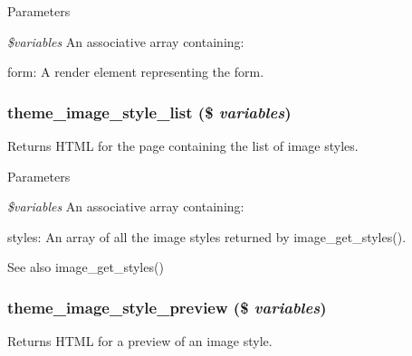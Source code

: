 \begin{DoxyParams}{Parameters}
\item[{\em \$variables}]An associative array containing:
\begin{DoxyItemize}
\item form: A render element representing the form. 
\end{DoxyItemize}\end{DoxyParams}
\hypertarget{group__themeable_gaa215d56002640f64d6fc84311b18c116}{
\subsubsection[{theme\_\-image\_\-style\_\-list}]{\setlength{\rightskip}{0pt plus 5cm}theme\_\-image\_\-style\_\-list (\$ {\em variables})}}
\label{group__themeable_gaa215d56002640f64d6fc84311b18c116}
Returns HTML for the page containing the list of image styles.


\begin{DoxyParams}{Parameters}
\item[{\em \$variables}]An associative array containing:
\begin{DoxyItemize}
\item styles: An array of all the image styles returned by image\_\-get\_\-styles().
\end{DoxyItemize}\end{DoxyParams}
\begin{DoxySeeAlso}{See also}
image\_\-get\_\-styles() 
\end{DoxySeeAlso}
\hypertarget{group__themeable_gadadcabb59ca4f10f98be76d80e224e4a}{
\subsubsection[{theme\_\-image\_\-style\_\-preview}]{\setlength{\rightskip}{0pt plus 5cm}theme\_\-image\_\-style\_\-preview (\$ {\em variables})}}
\label{group__themeable_gadadcabb59ca4f10f98be76d80e224e4a}
Returns HTML for a preview of an image style.


